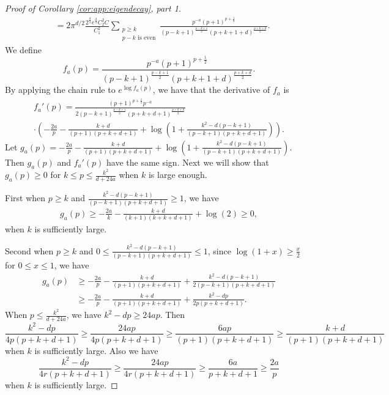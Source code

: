 \begin{proof}[Proof of Corollary \ref{cor:app:eigendecay}, part 1]
\begin{align}
&= 2\pi^{d/2}\frac{2^{\frac{d}{2}}e^{\frac{d}{2}}C_2^2C}{C_1^2}\sum_{\substack{p\geq k\\p-k\text{ is even}}} \frac{ p^{-a}\left({p+1}\right)^{p+\frac{1}{2}}}{\left({p-k+1}\right)^{\frac{p-k+1}{2}}\left({p+k+1+d}\right)^{\frac{p+k+d}{2}}}.
\label{eq:lambda_leq}
\end{align}
We define 
\begin{equation}
f_a(p)=\frac{ p^{-a}\left({p+1}\right)^{p+\frac{1}{2}}}{\left({p-k+1}\right)^{\frac{p-k+1}{2}}\left({p+k+1+d}\right)^{\frac{p+k+d}{2}}}. 
\label{eq:def_f}
\end{equation}
By applying the chain rule to $e^{\log f_a(p)}$, we have that the derivative of $f_a$ is
\begin{multline}
f_a'(p)= \frac{(p + 1)^{p + \frac{1}{2}} p^{-a} }{2(p-k+1)^{\frac{p -k+ 1}{2}} (p+k+d+1)^{\frac{p+k+d}{2} }}  \\ \cdot \left(-\frac{2a}{p}   - \frac{k+d}{(p + 1)(p+k+d+1)}  +  \log(1+\frac{k^2-d(p-k+1)}{(p-k+1)(p+k+d+1)})\right).    
\end{multline}
Let $g_a(p)=-\frac{2a}{p}   - \frac{k+d}{(p + 1)(p+k+d+1)}  +  \log(1+\frac{k^2-d(p-k+1)}{(p-k+1)(p+k+d+1)})$. Then $g_a(p)$ and $f_a'(p)$ have the same sign.
Next we will show that $g_a(p)\geq 0$ for $k\leq p\leq  \frac{k^2}{d+24a}$ when $k$ is large enough.

First when $p\geq k$ and 
$\frac{k^2-d(p-k+1)}{(p-k+1)(p+k+d+1)}\geq 1$, we have
\begin{align}
    g_a(p)\geq -\frac{2a}{k}   - \frac{k+d}{(k + 1)(k+k+d+1)}+\log(2) \geq 0,
\end{align}
when $k$ is sufficiently large.

Second when $p\geq k$ and 
$0\leq \frac{k^2-d(p-k+1)}{(p-k+1)(p+k+d+1)}\leq 1$, since $\log(1+x)\geq \frac{x}{2}$ for $0\leq x\leq 1$, we have
\begin{align*}
    g_a(p)&\geq -\frac{2a}{p}   - \frac{k+d}{(p + 1)(p+k+d+1)}+\frac{k^2-d(p-k+1)}{2(p-k+1)(p+k+d+1)}\\
    &\geq -\frac{2a}{p}   - \frac{k+d}{(p + 1)(p+k+d+1)}+\frac{k^2-dp}{2p(p+k+d+1)}.
\end{align*} 
When $p\leq \frac{k^2}{d+24a}$, we have $k^2-dp\geq 24ap$. Then 
\begin{equation*}
   \frac{k^2-dp}{4p(p+k+d+1)}\geq \frac{24ap}{4p(p+k+d+1)}\geq \frac{6ap}{(p+1)(p+k+d+1)} \geq \frac{k+d}{(p + 1)(p+k+d+1)}
\end{equation*} 
when $k$ is sufficiently large. 
Also we have 
\begin{equation*}
   \frac{k^2-dp}{4r(p+k+d+1)}\geq \frac{24ap}{4r(p+k+d+1)}\geq \frac{6a}{p+k+d+1} \geq \frac{2a}{p}
\end{equation*} 
when $k$ is sufficiently large. 


\end{proof}
